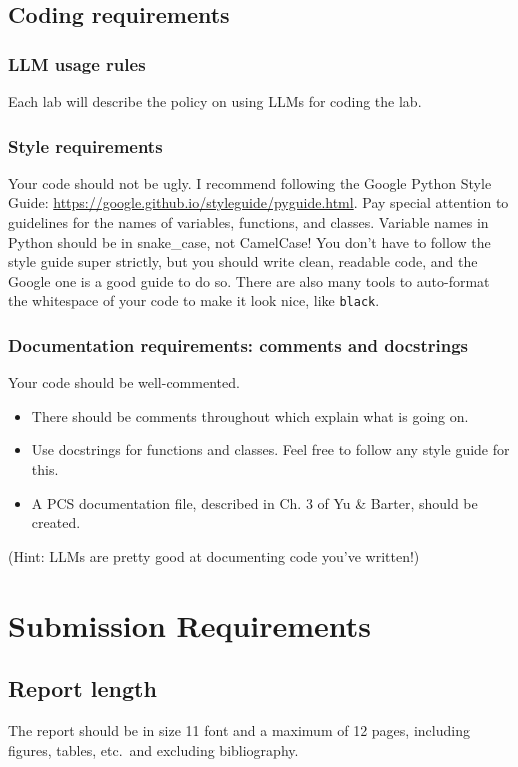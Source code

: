 \documentclass[letterpaper,12pt]{article}
\begin{document}
\subsection{Coding requirements}

\subsubsection{LLM usage rules}
Each lab will describe the policy on using LLMs for coding the lab.

\subsubsection{Style requirements}
Your code should not be ugly. I recommend following the Google Python Style Guide: \url{https://google.github.io/styleguide/pyguide.html}. Pay special attention to guidelines for the names of variables, functions, and classes. Variable names in Python should be in snake\_case, not CamelCase! You don't have to follow the style guide super strictly, but you should write clean, readable code, and the Google one is a good guide to do so. There are also many tools to auto-format the whitespace of your code to make it look nice, like \texttt{black}.

\subsubsection{Documentation requirements: comments and docstrings}
Your code should be well-commented.
\begin{itemize}
  \item There should be comments throughout which explain what is going on.
  \item Use docstrings for functions and classes. Feel free to follow any style guide for this.
  \item A PCS documentation file, described in Ch. 3 of Yu \& Barter, should be created.
\end{itemize}
(Hint: LLMs are pretty good at documenting code you've written!)

\section{Submission Requirements}

\subsection{Report length}
The report should be in size 11 font and a maximum of 12 pages, including figures, tables, etc.~and excluding bibliography.
\end{document}
